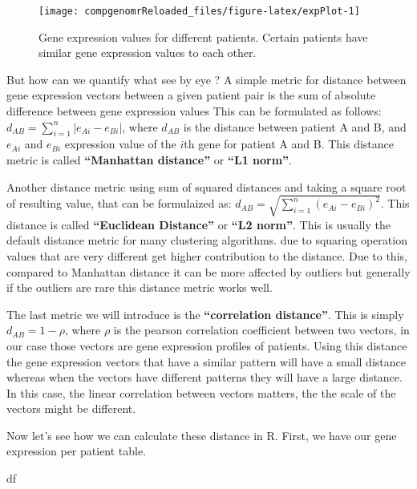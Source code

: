 \documentclass[12pt,]{krantz}
\newenvironment{Shaded}{\begin{snugshade}}{\end{snugshade}}
\newcommand{\NormalTok}[1]{#1}
\begin{document}
\begin{figure}

{\centering \texttt{[image: compgenomrReloaded\_files/figure-latex/expPlot-1]} 

}

\caption{Gene expression values for different patients. Certain patients have similar gene expression values to each other.}\label{fig:expPlot}
\end{figure}

But how can we quantify what see by eye ? A simple metric for distance between gene expression vectors between a given patient pair is the sum of absolute difference between gene expression values This can be formulated as follows: \(d_{AB}={\sum _{i=1}^{n}|e_{Ai}-e_{Bi}|}\), where \(d_{AB}\) is the distance between patient A and B, and \(e_{Ai}\) and \(e_{Bi}\) expression value of the \(i\)th gene for patient A and B. This distance metric is called \textbf{``Manhattan distance''} or \textbf{``L1 norm''}.

Another distance metric using sum of squared distances and taking a square root of resulting value, that can be formulaized as: \(d_{AB}={{\sqrt {\sum _{i=1}^{n}(e_{Ai}-e_{Bi})^{2}}}}\). This distance is called \textbf{``Euclidean Distance''} or \textbf{``L2 norm''}. This is usually the default distance metric for many clustering algorithms. due to squaring operation values that are very different get higher contribution to the distance. Due to this, compared to Manhattan distance it can be more affected by outliers but generally if the outliers are rare this distance metric works well.

The last metric we will introduce is the \textbf{``correlation distance''}. This is simply \(d_{AB}=1-\rho\), where \(\rho\) is the pearson correlation coefficient between two vectors, in our case those vectors are gene expression profiles of patients. Using this distance the gene expression vectors that have a similar pattern will have a small distance whereas when the vectors have different patterns they will have a large distance. In this case, the linear correlation between vectors matters, the the scale of the vectors might be different.

Now let's see how we can calculate these distance in R. First, we have our gene expression per patient table.

\begin{Shaded}
\begin{Highlighting}[]
\NormalTok{df}
\end{Highlighting}
\end{Shaded}
\end{document}
